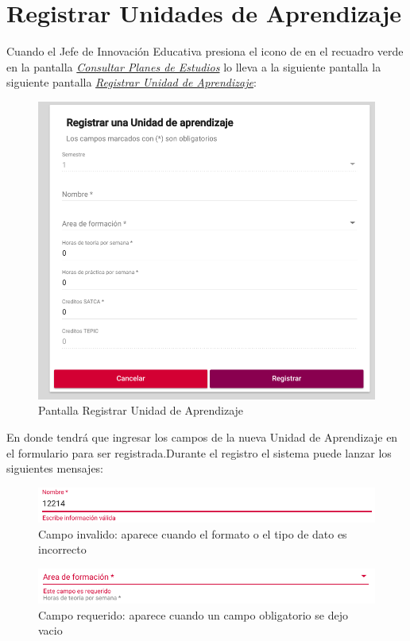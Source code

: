 \section{Registrar Unidades de Aprendizaje}
Cuando el Jefe de Innovación Educativa presiona el icono de \IUbutton{+} en el recuadro verde en la pantalla \hyperlink{consultarUA}{\textit{Consultar Planes de Estudios}} lo lleva a la siguiente pantalla la siguiente pantalla \hyperlink{registrarUA}{\textit{Registrar Unidad de Aprendizaje}}:\\
\begin{figure}[!hbtp]
    \centering
    \hypertarget{registrarUA}{\includegraphics[width=0.7\linewidth]{images/GUA/registrarUA}}
    \caption{Pantalla Registrar Unidad de Aprendizaje}
    \label{registrarUA}
\end{figure}
\newpage
En donde tendrá que ingresar los campos de la nueva Unidad de Aprendizaje en el formulario para ser registrada.Durante el registro el sistema puede lanzar los siguientes mensajes:
\begin{figure}[!hbtp]
    \centering
    \hypertarget{invalidoR}{\includegraphics[width=0.7\linewidth]{images/GUA/invalido}}
    \caption{Campo invalido: aparece cuando el formato o el tipo de dato es incorrecto}
    \label{invalidoR}
\end{figure}
\begin{figure}[!hbtp]
    \centering
    \hypertarget{requeridoR}{\includegraphics[width=0.7\linewidth]{images/GUA/requerido}}
    \caption{Campo requerido: aparece cuando un campo obligatorio se dejo vacio}
    \label{requeridoR}
\end{figure}
